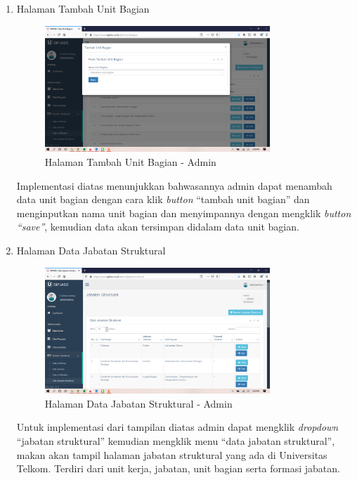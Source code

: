 \begin{enumerate}
	\item Halaman Tambah Unit Bagian
	\begin{figure}
		\centering
		\includegraphics[width=0.8\textwidth]
		{pics/admin/implementasi/tambahunitbagian.png}
		\caption{Halaman Tambah Unit Bagian - Admin}
		\label{fig:CC10}
	\end{figure}
	Implementasi diatas menunjukkan bahwasannya admin dapat menambah data unit bagian dengan cara klik \textit{button} “tambah unit bagian” dan menginputkan nama unit bagian dan menyimpannya dengan mengklik \textit{button “save”}, kemudian data akan tersimpan didalam data unit bagian. 
	
	\item Halaman Data Jabatan Struktural
	\begin{figure}
		\centering
		\includegraphics[width=0.8\textwidth]
		{pics/admin/implementasi/datajabstruk.png}
		\caption{Halaman Data Jabatan Struktural - Admin}
		\label{fig:CC10}
	\end{figure}
	Untuk implementasi dari tampilan diatas admin dapat mengklik \textit{dropdown} “jabatan struktural” kemudian mengklik menu “data jabatan struktural”, makan akan tampil halaman jabatan struktural yang ada di Universitas Telkom. Terdiri dari unit kerja, jabatan, unit bagian serta formasi jabatan. 
	

\end{enumerate}
